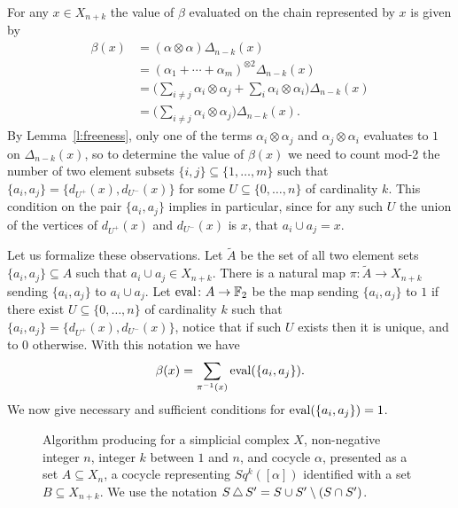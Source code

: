 For any $x \in X_{n+k}$ the value of $\beta$ evaluated on the chain represented by $x$ is given by 
\begin{align*}
\beta(x) & =
(\alpha \otimes \alpha) \Delta_{n-k}(x) \\ & =
(\alpha_1 + \cdots + \alpha_m)^{\otimes 2} \Delta_{n-k}(x) \\ & =
\Big(\sum_{i \neq j} \alpha_i \otimes \alpha_j + \sum_{i} \alpha_i \otimes \alpha_i \Big)
\Delta_{n-k}(x) \\ & =
\Big(\sum_{i \neq j} \alpha_i \otimes \alpha_j\Big)
\Delta_{n-k}(x).
\end{align*}
By Lemma~\ref{l:freeness}, only one of the terms $\alpha_i \otimes \alpha_j$ and $\alpha_j \otimes \alpha_i$ evaluates to $1$ on $\Delta_{n-k}(x)$, so to determine the value of $\beta(x)$ we need to count mod-2 the number of two element subsets $\{i,j\} \subseteq \{1,\dots, m\}$ such that $\{a_i, a_j\} = \{d_{U^+}(x), d_{U^-}(x)\}$ for some $U \subseteq \{0, \dots, n\}$ of cardinality $k$.
This condition on the pair $\{a_i, a_j\}$ implies in particular, since for any such $U$ the union of the vertices of $d_{U^+}(x)$ and $d_{U^-}(x)$ is $x$, that $a_i \cup a_j = x$.

Let us formalize these observations.
Let $\widetilde{A}$ be the set of all two element sets $\{a_i, a_j\} \subseteq A$ such that $a_i \cup a_j \in X_{n+k}$.
There is a natural map $\pi \colon \widetilde{A} \to X_{n+k}$ sending $\{a_i, a_j\}$ to $a_i \cup a_j$.
Let $\operatorname{\mathrm{eval}} \colon A \to \mathbb{F}_2$ be the map sending $\{a_i, a_j\}$ to $1$ if there exist $U \subseteq \{0,\dots,n\}$ of cardinality $k$ such that $\{a_i, a_j\} = \{d_{U^+}(x), d_{U^-}(x)\}$, notice that if such $U$ exists then it is unique, and to $0$ otherwise.
With this notation we have
\begin{equation*}
\beta(x) = \sum_{\pi^{-1}(x)} \operatorname{\mathrm{eval}}(\{a_i, a_j\}).
\end{equation*}
We now give necessary and sufficient conditions for $\operatorname{\mathrm{eval}}(\{a_i, a_j\}) = 1$.


\begin{figure}
	
	\caption{Algorithm producing for a simplicial complex $X$, non-negative integer $n$, integer $k$ between $1$ and $n$, and cocycle $\alpha$, presented as a set $A \subseteq X_n$, a cocycle representing $Sq^k([\alpha])$ identified with a set $B \subseteq X_{n+k}$.
	We use the notation $S \operatorname{\triangle} S^\prime = S \cup S^\prime \setminus (S \cap S^\prime)$.}
	\label{f:algorithm}
\end{figure}